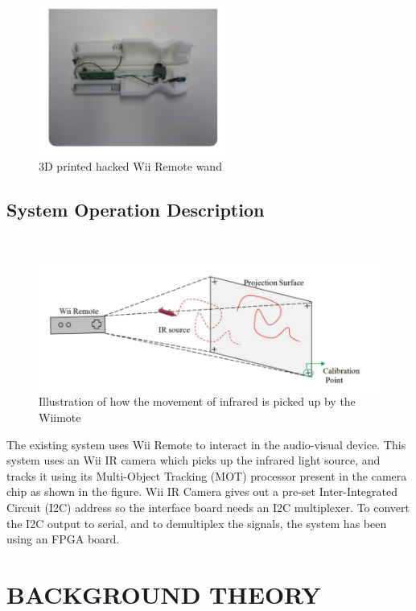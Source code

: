 \documentclass[12pt, a4paper]{article}
\begin{document}
\begin{figure}[htp]
\centering
\includegraphics[width=2.4in]{wand1}
\caption{3D printed hacked Wii Remote wand}
\label{}
\end{figure}

\subsection{System Operation Description}
~\\
\begin{figure}[htp]
\centering
\includegraphics[scale=0.35]{wiiiii.png}
\caption{Illustration of how the movement of infrared is picked up by the Wiimote}
\label{}
\end{figure}

The existing system uses Wii Remote to interact in the audio-visual device. This system uses an Wii IR camera which picks up the infrared light source, and tracks it using its Multi-Object Tracking (MOT) processor present in the camera chip as shown in the figure. Wii IR Camera gives out a pre-set Inter-Integrated Circuit (I2C) address so the interface board needs an I2C multiplexer. To convert the I2C output to serial, and to demultiplex the signals, the system has been using an FPGA board. 
\newpage
\section{BACKGROUND THEORY}
~\\
\end{document}
